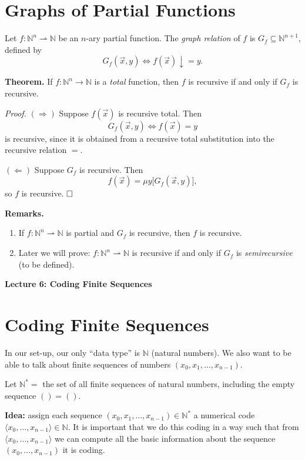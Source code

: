 \documentclass[11pt]{article}
\begin{document}
\section{Graphs of Partial Functions}

Let $f\colon \mathbb{N}^n \rightharpoonup \mathbb{N}$ be an $n$-ary partial function. The \emph{graph relation} of $f$ is $G_f \subseteq \mathbb{N}^{n+1}$, defined by
\[
    G_f(\vec{x}, y) \iff f(\vec{x}){\downarrow}= y.
\]

\textbf{Theorem.} If $f\colon \mathbb{N}^n \to \mathbb{N}$ is a \emph{total} function, then $f$ is recursive if and only if $G_f$ is recursive.

\textit{Proof.} $(\Rightarrow)$ Suppose $f(\vec{x})$ is recursive total. Then
\[
    G_f(\vec{x}, y) \iff f(\vec{x}) = y
\]
is recursive, since it is obtained from a recursive total substitution into the recursive relation $=$.

$(\Leftarrow)$ Suppose $G_f$ is recursive. Then
\[
    f(\vec{x}) = \mu y\bigl[G_f(\vec{x}, y)\bigr],
\]
so $f$ is recursive. $\hfill\square$

\textbf{Remarks.}
\begin{enumerate}[leftmargin=1.8em, label=(\arabic*)]
    \item If $f\colon \mathbb{N}^n \rightharpoonup \mathbb{N}$ is partial and $G_f$ is recursive, then $f$ is recursive.
    \item Later we will prove: $f\colon \mathbb{N}^n \rightharpoonup \mathbb{N}$ is recursive if and only if $G_f$ is \emph{semirecursive} (to be defined).
\end{enumerate}

\newpage

{\LARGE\bfseries Lecture 6: Coding Finite Sequences}

\section{Coding Finite Sequences}

In our set-up, our only ``data type'' is $\mathbb{N}$ (natural numbers). We also want to be able to talk about finite sequences of numbers $(x_0, x_1, \dots, x_{n-1})$.

Let $\mathbb{N}^* =$ the set of all finite sequences of natural numbers, including the empty sequence $() = ()$.

\textbf{Idea:} assign each sequence $(x_0, x_1, \dots, x_{n-1}) \in \mathbb{N}^*$ a numerical code $\langle x_0, \dots, x_{n-1}\rangle \in \mathbb{N}$. It is important that we do this coding in a way such that from $\langle x_0, \dots, x_{n-1}\rangle$ we can compute all the basic information about the sequence $(x_0, \dots, x_{n-1})$ it is coding.
\end{document}
